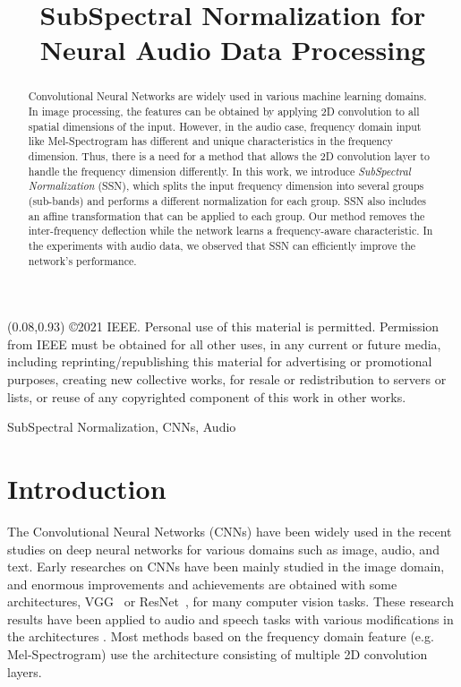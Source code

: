 \documentclass{article}
\title{SubSpectral Normalization for Neural Audio Data Processing}
\newcommand{\copyrightline}{
    \begin{textblock}{0.84}(0.08,0.93)    \noindent
         \footnotesize
         \copyright 2021 IEEE. Personal use of this material is permitted. Permission from IEEE must be obtained for all other uses, in any current or future media, including reprinting/republishing this material for advertising or promotional purposes, creating new collective works, for resale or redistribution to servers or lists, or reuse of any copyrighted component of this work in other works.
    \end{textblock}
}
\begin{document}
\maketitle
\copyrightline
\begin{abstract}
Convolutional Neural Networks are widely used in various machine learning domains. In image processing, the features can be obtained by applying 2D convolution to all spatial dimensions of the input. However, in the audio case, frequency domain input like Mel-Spectrogram has different and unique characteristics in the frequency dimension. Thus, there is a need for a method that allows the 2D convolution layer to handle the frequency dimension differently. In this work, we introduce \textit{SubSpectral Normalization} (SSN), which splits the input frequency dimension into several groups (sub-bands) and performs a different normalization for each group. SSN also includes an affine transformation that can be applied to each group. Our method removes the inter-frequency deflection while the network learns a frequency-aware characteristic. In the experiments with audio data, we observed that SSN can efficiently improve the network's performance. 
\end{abstract}
\begin{keywords}
SubSpectral Normalization, CNNs, Audio
\end{keywords}
\section{Introduction}
\label{sec:intro}
The Convolutional Neural Networks (CNNs) have been widely used in the recent studies on deep neural networks for various domains such as image, audio, and text. Early researches on CNNs have been mainly studied in the image domain, and enormous improvements and achievements are obtained with some architectures, VGG~\cite{SimonyanZ14a} or ResNet~\cite{he2016deep}, for many computer vision tasks. These research results have been applied to audio and speech tasks with various modifications in the architectures \cite{salamon2017deep, tang2018deep, choi2019temporal}. Most methods \cite{abdel2014convolutional, hori2017advances, 7952132, koutini2019receptive} based on the frequency domain feature (e.g. Mel-Spectrogram) use the architecture consisting of multiple 2D convolution layers.   
\end{document}
